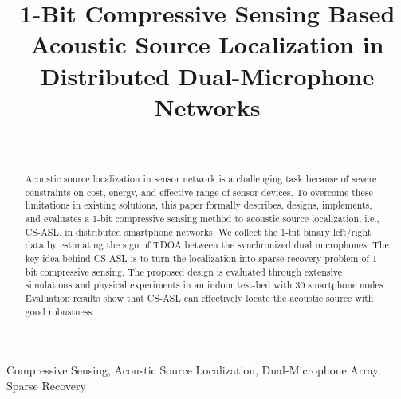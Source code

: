 \documentclass[journal]{IEEEtran}
\begin{document}
\title{1-Bit Compressive Sensing  Based Acoustic Source Localization  in Distributed Dual-Microphone Networks}

\author{\\
}

\maketitle

\thispagestyle{plain}
\pagestyle{plain}

\begin{abstract}
Acoustic source localization in sensor network is a challenging task because of severe constraints on cost, energy, and effective range of sensor devices.
To overcome these limitations in existing solutions, this paper formally describes, designs, implements, and evaluates a 1-bit compressive sensing method to acoustic source localization, i.e., CS-ASL, in distributed smartphone networks.
We  collect the 1-bit binary left/right data  by estimating the sign of TDOA between the synchronized dual microphones. 
The key idea behind CS-ASL is to turn the localization  into sparse recovery problem of 1-bit  compressive sensing. 
The proposed design is evaluated through extensive simulations and physical experiments in an indoor test-bed with 30 smartphone nodes. Evaluation results show that CS-ASL  can effectively locate the acoustic source with good robustness.



\end{abstract}

\begin{IEEEkeywords}
Compressive Sensing, Acoustic Source Localization,  Dual-Microphone Array, Sparse Recovery
\end{IEEEkeywords}



\IEEEpeerreviewmaketitle



%

%





\end{document}
